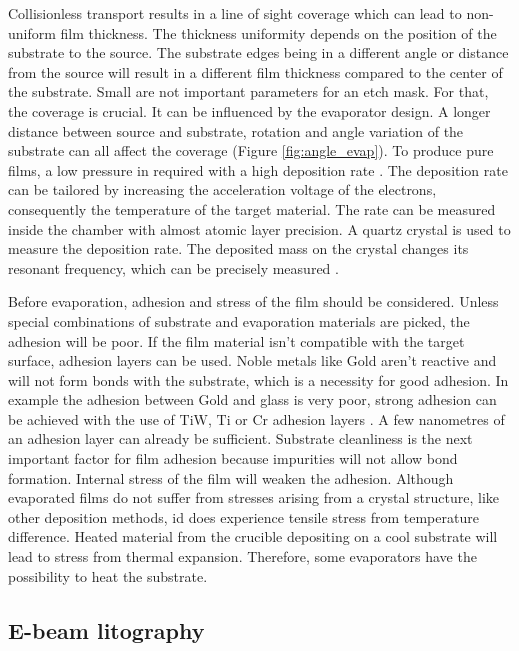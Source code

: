 \documentclass[final]{jyflluk}
\begin{document}
Collisionless transport results in a line of sight coverage which can lead to non-uniform film thickness. The thickness uniformity depends on the position of the substrate to the source. The substrate edges being in a different angle or distance from the source will result in a different film thickness compared to the center of the substrate. Small are not important parameters for an etch mask. For that, the coverage is crucial. It can be influenced by the evaporator design. A longer distance between source and substrate, rotation and angle variation of the substrate can all affect the coverage (Figure \ref{fig:angle_evap}).
To produce pure films, a low pressure in required with a high deposition rate \cite{ohring1992materials}. The deposition rate can be tailored by increasing the acceleration voltage of the electrons, consequently the temperature of the target material. The rate can be measured inside the chamber with almost atomic layer precision. A quartz crystal is used to measure the deposition rate. The deposited mass on the crystal changes its resonant frequency, which can be precisely measured \cite{franssila2010introduction}. 

Before evaporation, adhesion and stress of the film should be considered. Unless special combinations of substrate and evaporation materials are picked, the adhesion will be poor. If the film material isn’t compatible with the target surface, adhesion layers can be used. Noble metals like Gold aren’t reactive and will not form bonds with the substrate, which is a necessity for good adhesion. In example the adhesion between Gold and glass is very poor, strong adhesion can be achieved with the use of $\mathrm{TiW}$, $\mathrm{Ti}$ or $\mathrm{Cr}$ adhesion layers \cite{chen2013study}. A few nanometres of an adhesion layer can already be sufficient. Substrate cleanliness is the next important factor for film adhesion because impurities will not allow bond formation. Internal stress of the film will weaken the adhesion. Although evaporated films do not suffer from stresses arising from a crystal structure, like other deposition methods, id does experience tensile stress from temperature difference. Heated material from the crucible depositing on a cool substrate will lead to stress from thermal expansion. Therefore, some evaporators have the possibility to heat the substrate. \cite{franssila2010introduction}


\subsection{E-beam litography}
\label{sec:xx3}
\end{document}
